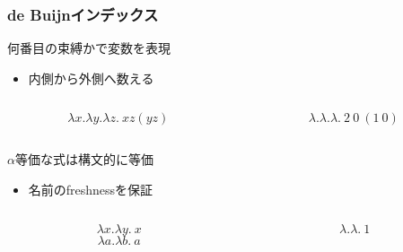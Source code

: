 \documentclass[dvipdfmx,cjk,xcolor=dvipsnames,envcountsect,notheorems,12pt]{beamer}
\theoremstyle{definition}
\begin{document}
\begin{frame}
	\frametitle{de Buijnインデックス}
	\LARGE
	何番目の束縛かで変数を表現
	\begin{itemize}
		\item 内側から外側へ数える
	\end{itemize}
	\begin{columns}
		\begin{column}{0.5\textwidth}
			\[ \lambda x. \lambda y. \lambda z.~x z (y z) \]
		\end{column}
		\begin{column}{0.5\textwidth}
			\[ \lambda. \lambda. \lambda.~2~0~(1~0) \]
		\end{column}
	\end{columns}

	\vfill

	$\alpha$等価な式は構文的に等価
	\begin{itemize}
		\item 名前のfreshnessを保証
	\end{itemize}
	\begin{columns}
		\begin{column}{0.5\textwidth}
			\[ \lambda x.\lambda y.~x \]
			\[ \lambda a.\lambda b.~a \]
		\end{column}
		\begin{column}{0.5\textwidth}
			\[ \lambda.\lambda.~1 \]
		\end{column}
	\end{columns}
\end{frame}
\end{document}

